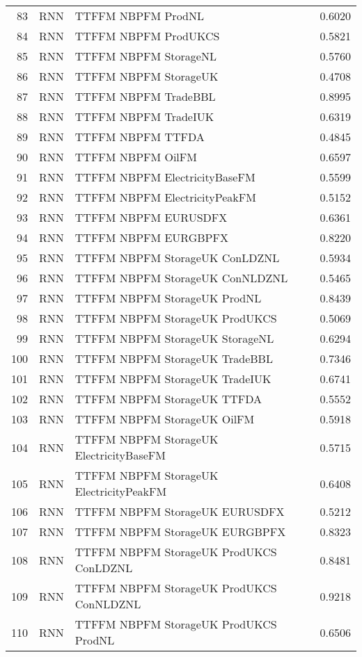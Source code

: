 \begin{table}[ht]
\begin{tabular}{rllr}
  83 & RNN & TTFFM NBPFM ProdNL & 0.6020 \\ 
  84 & RNN & TTFFM NBPFM ProdUKCS & 0.5821 \\ 
  85 & RNN & TTFFM NBPFM StorageNL & 0.5760 \\ 
  86 & RNN & TTFFM NBPFM StorageUK & 0.4708 \\ 
  87 & RNN & TTFFM NBPFM TradeBBL & 0.8995 \\ 
  88 & RNN & TTFFM NBPFM TradeIUK & 0.6319 \\ 
  89 & RNN & TTFFM NBPFM TTFDA & 0.4845 \\ 
  90 & RNN & TTFFM NBPFM OilFM & 0.6597 \\ 
  91 & RNN & TTFFM NBPFM ElectricityBaseFM & 0.5599 \\ 
  92 & RNN & TTFFM NBPFM ElectricityPeakFM & 0.5152 \\ 
  93 & RNN & TTFFM NBPFM EURUSDFX & 0.6361 \\ 
  94 & RNN & TTFFM NBPFM EURGBPFX & 0.8220 \\ 
  95 & RNN & TTFFM NBPFM StorageUK ConLDZNL & 0.5934 \\ 
  96 & RNN & TTFFM NBPFM StorageUK ConNLDZNL & 0.5465 \\ 
  97 & RNN & TTFFM NBPFM StorageUK ProdNL & 0.8439 \\ 
  98 & RNN & TTFFM NBPFM StorageUK ProdUKCS & 0.5069 \\ 
  99 & RNN & TTFFM NBPFM StorageUK StorageNL & 0.6294 \\ 
  100 & RNN & TTFFM NBPFM StorageUK TradeBBL & 0.7346 \\ 
  101 & RNN & TTFFM NBPFM StorageUK TradeIUK & 0.6741 \\ 
  102 & RNN & TTFFM NBPFM StorageUK TTFDA & 0.5552 \\ 
  103 & RNN & TTFFM NBPFM StorageUK OilFM & 0.5918 \\ 
  104 & RNN & TTFFM NBPFM StorageUK ElectricityBaseFM & 0.5715 \\ 
  105 & RNN & TTFFM NBPFM StorageUK ElectricityPeakFM & 0.6408 \\ 
  106 & RNN & TTFFM NBPFM StorageUK EURUSDFX & 0.5212 \\ 
  107 & RNN & TTFFM NBPFM StorageUK EURGBPFX & 0.8323 \\ 
  108 & RNN & TTFFM NBPFM StorageUK ProdUKCS ConLDZNL & 0.8481 \\ 
  109 & RNN & TTFFM NBPFM StorageUK ProdUKCS ConNLDZNL & 0.9218 \\ 
  110 & RNN & TTFFM NBPFM StorageUK ProdUKCS ProdNL & 0.6506 \\ 

\end{tabular}
\end{table}
